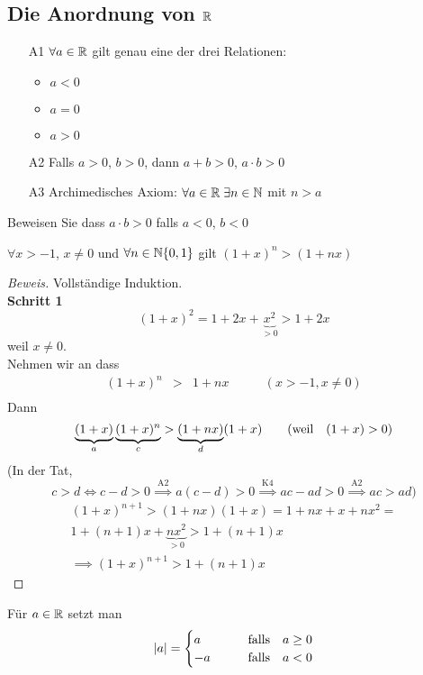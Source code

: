 \subsection{Die Anordnung von $\mathbb{R}$}
\begin{itemize}
  \item[A1] $\forall a\in\mathbb{R}$ gilt genau eine der drei Relationen:
    \begin{itemize}
      \item $a<0$
      \item $a=0$
      \item $a>0$
    \end{itemize}
  \item[A2] Falls $a>0$, $b>0$, dann $a+b>0$, $a\cdot b>0$
  \item[A3] Archimedisches Axiom: $\forall a\in\mathbb{R}\; \exists n\in\mathbb{N}$ mit $n>a$
\end{itemize}
\begin{Ueb}
  Beweisen Sie dass $a\cdot b>0$ falls $a<0$, $b<0$
\end{Ueb}
\begin{Sat}
  $\forall x>-1$, $x\neq 0$ und $\forall n\in\mathbb{N}\\\{0,1\}$ gilt $(1+x)^n > (1+nx)$
\end{Sat}
\begin{proof}[Beweis]Vollst\"andige Induktion.\\
{\bf Schritt 1}
  $$(1+x)^2 = 1+2x+\underbrace{x^2}_{>0}>1+2x$$
  weil $x\neq0$.\\
  Nehmen wir an dass
  \begin{align*}
    (1+x)^n&>& 1+nx &\qquad (x>-1, x\neq 0)\\
   \end{align*}
Dann
$$
   \underbrace{(1+x)}_a \underbrace{(1+x)^n}_c > \underbrace{(1+nx)}_d(1+x) \qquad (\mbox{weil}\quad (1+x)>0)\\
$$
(In der Tat,  
$$c>d \iff c-d>0 \stackrel{\text{A2}}{\implies} a(c-d) > 0 \stackrel{\text{K4}}{\implies} ac-ad > 0 
\stackrel{\text{A2}}{\implies} ac>ad)$$
  \begin{align*}
    (1+x)^{n+1} > (1+nx)(1+x) = 1+nx+x+nx^2=\\
    1+(n+1)x+\underbrace{nx^2}_{>0}>1+(n+1)x\\
    \implies (1+x)^{n+1} > 1+(n+1)x
  \end{align*}

 \end{proof}
\begin{Def}
  Für $a\in\mathbb{R}$ setzt man
  \begin{align*}
  \mathopen| a \mathclose|=
    \begin{cases}
      a &\qquad\mbox{falls}\quad a\geq0\\
      -a &\qquad\mbox{falls}\quad a < 0\\
    \end{cases}
  \end{align*}
\end{Def}
